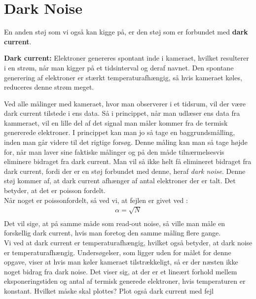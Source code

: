 \documentclass[working]{tuftebook}
\begin{document}
\section{Dark Noise}
En anden støj som vi også kan kigge på, er den støj som er forbundet med \textbf{dark current}.
\begin{marginfigure}
	\textbf{Dark current:} Elektroner genereres spontant inde i kameraet, hvilket resulterer i en strøm, når man kigger på et tidsinterval og deraf navnet. Den spontane generering af elektroner er stærkt temperaturafhængig, så hvis kameraet køles, reduceres denne strøm meget.\cite{HH}

\end{marginfigure}
Ved alle målinger med kameraet, hvor man observerer i et tidsrum, vil der være dark current tilstede i ens data. Så i princippet, når man udlæser ens data fra kammeraet, vil en lille del af det signal man måler kommer fra de termisk genererede elektroner. I princippet kan man jo så tage en baggrundsmålling, inden man går videre til det rigtige forsøg. Denne måling kan man så tage højde for, når man laver sine faktiske målinger og på den måde tilnærmelsesvis eliminere bidraget fra dark current. Man vil så ikke helt få elimineret bidraget fra dark current, fordi der er en støj forbundet med denne, heraf \textit{dark noise}. Denne støj kommer af, at dark current afhænger af antal elektroner der er talt. Det betyder, at det er poisson fordelt. 
\\
Når noget er poissonfordelt, så ved vi, at fejlen er givet ved :
\begin{align*}
\alpha = \sqrt{N} \\
\end{align*}
Det vil sige, at på samme måde som read-out noise, så ville man måle en forskellig dark current, hvis man foretog den samme måling flere gange. 
\\
Vi ved at dark current er temperaturafhængig, hvilket også betyder, at dark noise er temperaturafhængig. Undersøgelser, som ligger uden for målet for denne opgave, viser at hvis man køler kameraet tilstrækkeligt, så er der næsten ikke noget bidrag fra dark noise. Det viser sig, at der er et lineært forhold mellem eksponeringstiden og antal af termisk generede elektroner, hvis temperaturen er konstant. Hvilket måske skal plottes? Plot også dark current med fejl
\end{document}
